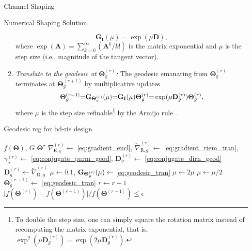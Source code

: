 \documentclass[journal]{IEEEtran}
\begin{document}
\begin{section}{Channel Shaping}
\begin{subsection}{Numerical Shaping Solution}
\begin{enumerate}[label=(\roman*)]
				\begin{equation}
					\label{eq:geodesic_iden}
					\mathbf{G}_\mathbf{I}(\mu) = \exp(\mu \mathbf{D}),
				\end{equation}
				where $\exp(\mathbf{A}) = \sum_{k=0}^\infty (\mathbf{A}^k/k!)$ is the matrix exponential and $\mu$ is the step size (i.e., magnitude of the tangent vector).
			\item \emph{Translate to the geodesic at $\mathbf{\Theta}_g^{(r)}$:} The geodesic emanating from $\mathbf{\Theta}_g^{(r)}$ terminates at $\mathbf{\Theta}_g^{(r+1)}$ by multiplicative updates
				\begin{equation}
					\label{eq:geodesic_tran}
					\mathbf{\Theta}_g^{(r+1)} {=} \mathbf{G}_{\smash{\mathbf{\Theta}_g^{(r)}}}(\mu) {=} \mathbf{G}_\mathbf{I}(\mu) \mathbf{\Theta}_g^{(r)} {=} \exp(\mu \mathbf{D}_g^{(r)}) \mathbf{\Theta}_g^{(r)},
				\end{equation}
				where $\mu$ is the step size refinable\footnote{To double the step size, one can simply square the rotation matrix instead of recomputing the matrix exponential, that is, $\exp^2(\mu \mathbf{D}_g^{(r)}) = \exp(2 \mu \mathbf{D}_g^{(r)})$.} by the Armijo rule \cite{Armijo1966}.
		\end{enumerate}

		\begin{algorithm}[!t]
			\footnotesize
			\caption{Geodesic \gls{rcg} for \gls{bd}-\gls{ris} design}
			\label{ag:rcg}
			\begin{algorithmic}[1]
				\Require $f(\mathbf{\Theta})$, $G$
				\Ensure $\mathbf{\Theta}^\star$
				\Repeat
				\State $\nabla_{\mathrm{E},g}^{(r)} \gets$ \eqref{eq:gradient_eucl}, $\tilde{\nabla}_{\mathrm{R},g}^{(r)} \gets$ \eqref{eq:gradient_riem_tran}, ${\gamma}_g^{(r)} \gets$ \eqref{eq:conjugate_parm_geod}, $\mathbf{D}_g^{(r)} \gets$ \eqref{eq:conjugate_dirn_geod}
				 
				\State $\mathbf{D}_g^{(r)} \gets \tilde{\nabla}_{\mathrm{R},g}^{(r)}$
				\EndIf
				\State $\mu \gets 0.1$, $\mathbf{G}_{\smash{\mathbf{\Theta}_g^{(r)}}}(\mu) \gets$ \eqref{eq:geodesic_tran}
				\label{ln:armijo_start}
				\State $\mu \gets 2 \mu$
				\EndWhile
				\State $\mu \gets \mu / 2$
				\EndWhile \label{ln:armijo_end}
				\State $\mathbf{\Theta}_g^{(r+1)} \gets$ \eqref{eq:geodesic_tran}
				\EndFor
				\State $r \gets r+1$
				\Until $\lvert f(\mathbf{\Theta}^{(r)}) - f(\mathbf{\Theta}^{(r-1)}) \rvert / f(\mathbf{\Theta}^{(r-1)}) \le \epsilon$
			\end{algorithmic}
		\end{algorithm}


\end{subsection}
\end{section}
\end{document}
